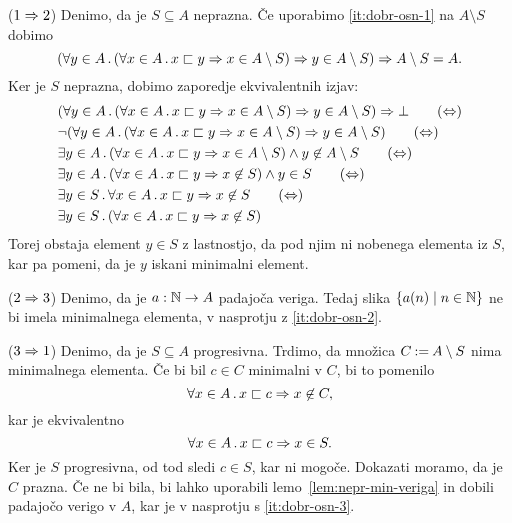 \begin{dokaz}
  ($1 \Rightarrow 2$)
  Denimo, da je $S \subseteq A$ neprazna. Če uporabimo \eqref{it:dobr-osn-1} na $A \setminus S$ dobimo
  \begin{equation*}
    (\forall y \in A \,.\, (\forall x \in A \,.\, x \sqsubset y \Rightarrow x \in A \setminus S) \Rightarrow y \in A \setminus S) \Rightarrow A \setminus S = A.
  \end{equation*}
  Ker je $S$ neprazna, dobimo zaporedje ekvivalentnih izjav:
  \begin{align*}
    &(\all{y \in A} (\all{x \in A} x \sqsubset y \lthen x \in A \setminus S) \lthen y \in A \setminus S) \lthen \bot
    \tag{$\liff$} \\
    &\lnot (\all{y \in A} (\all{x \in A} x \sqsubset y \lthen x \in A \setminus S) \lthen y \in A \setminus S)
    \tag{$\liff$} \\
    &\some{y \in A} (\all{x \in A} x \sqsubset y \lthen x \in A \setminus S) \land y \not\in A \setminus S
    \tag{$\liff$} \\
    &\some{y \in A} (\all{x \in A} x \sqsubset y \lthen x \not\in S) \land y \in S
    \tag{$\liff$} \\
    &\some{y \in S} \all{x \in A} x \sqsubset y \lthen x \not\in S
    \tag{$\liff$} \\
    &\some{y \in S} (\all{x \in A} x \sqsubset y \lthen x \not\in S) \notag
  \end{align*}
  Torej obstaja element $y \in S$ z lastnostjo, da pod njim ni nobenega elementa iz
  $S$, kar pa pomeni, da je $y$ iskani minimalni element.

  ($2 \Rightarrow 3$) Denimo, da je $a : \mathbb{N} \to A$ padajoča veriga. Tedaj slika $\left\{ a(n) \mid n \in \mathbb{N} \right\}$ ne bi imela
  minimalnega elementa, v nasprotju z \eqref{it:dobr-osn-2}.

  ($3 \Rightarrow 1$) Denimo, da je $S \subseteq A$ progresivna. Trdimo, da množica $C \mathbin{{:}{=}} A \setminus S$ nima
  minimalnega elementa. Če bi bil $c \in C$ minimalni v $C$, bi to pomenilo
  \begin{equation*}
    \forall x \in A \,.\, x \sqsubset c \Rightarrow x \not\in C,
  \end{equation*}
  kar je ekvivalentno
  \begin{equation*}
    \forall x \in A \,.\, x \sqsubset c \Rightarrow x \in S.
  \end{equation*}
  Ker je $S$ progresivna, od tod sledi $c \in S$, kar ni mogoče.
  Dokazati moramo, da je $C$ prazna. Če ne bi bila, bi lahko uporabili lemo~\ref{lem:nepr-min-veriga} in dobili padajočo verigo v $A$, kar je v nasprotju s \eqref{it:dobr-osn-3}.
\end{dokaz}

